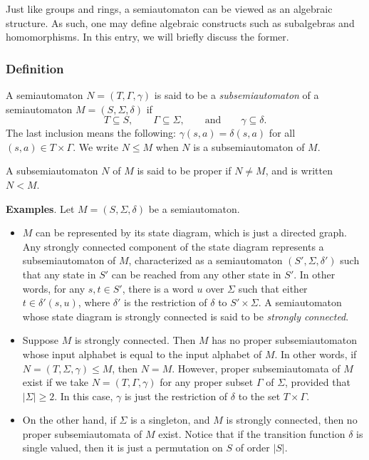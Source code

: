 \documentclass[12pt]{article}
\begin{document}
Just like groups and rings, a semiautomaton can be viewed as an algebraic structure.  As such, one may define algebraic constructs such as subalgebras and homomorphisms.  In this entry, we will briefly discuss the former.

\subsubsection*{Definition}

A semiautomaton $N=(T,\Gamma,\gamma)$ is said to be a \emph{subsemiautomaton} of a semiautomaton $M=(S,\Sigma,\delta)$ if $$T\subseteq S, \qquad \Gamma\subseteq \Sigma, \qquad \mbox{and} \qquad \gamma \subseteq \delta.$$  The last inclusion means the following: $\gamma(s,a)= \delta(s,a)$ for all $(s,a)\in T\times \Gamma$.  We write $N\le M$ when $N$ is a subsemiautomaton of $M$.  

A subsemiautomaton $N$ of $M$ is said to be proper if $N\ne M$, and is written $N<M$.

\textbf{Examples}.  Let $M=(S,\Sigma,\delta)$ be a semiautomaton.
\begin{itemize}
\item $M$ can be represented by its state diagram, which is just a directed graph.  Any strongly connected component of the state diagram represents a subsemiautomaton of $M$, characterized as a semiautomaton $(S',\Sigma,\delta')$ such that any state in $S'$ can be reached from any other state in $S'$.  In other words, for any $s,t\in S'$, there is a word $u$ over $\Sigma$ such that either $t\in \delta'(s,u)$, where $\delta'$ is the restriction of $\delta$ to $S'\times \Sigma$.  A semiautomaton whose state diagram is strongly connected is said to be \emph{strongly connected}.
\item Suppose $M$ is strongly connected.  Then $M$ has no proper subsemiautomaton whose input alphabet is equal to the input alphabet of $M$.  In other words, if $N=(T,\Sigma,\gamma)\le M$, then $N=M$.  However, proper subsemiautomata of $M$ exist if we take $N=(T,\Gamma,\gamma)$ for any proper subset $\Gamma$ of $\Sigma$, provided that $|\Sigma|\ge 2$.  In this case, $\gamma$ is just the restriction of $\delta$ to the set $T\times \Gamma$.
\item On the other hand, if $\Sigma$ is a singleton, and $M$ is strongly connected, then no proper subsemiautomata of $M$ exist.  Notice that if the transition function $\delta$ is single valued, then it is just a permutation on $S$ of order $|S|$.
\end{itemize}
\end{document}
